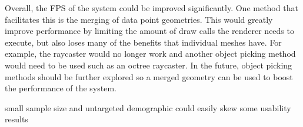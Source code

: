 {{		Overall, the FPS of the system could be improved significantly. One method that facilitates this is the merging of data point geometries. This would greatly improve performance by limiting the amount of draw calls the renderer needs to execute, but also loses many of the benefits that individual meshes have. For example, the raycaster would no longer work and another object picking method would need to be used such as an octree raycaster. In the future, object picking methods should be further explored so a merged geometry can be used to boost the performance of the system.

	}

}

small sample size and untargeted demographic could easily skew some usability results
